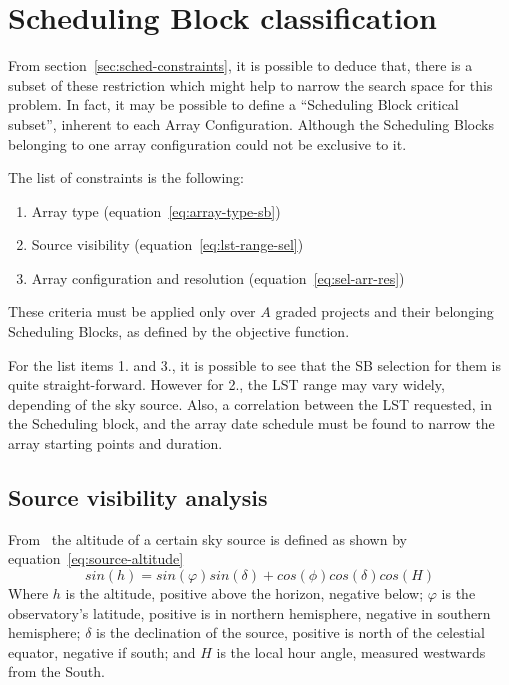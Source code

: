 \section{Scheduling Block classification}
\label{sec:array-sb-classification}
From section~\ref{sec:sched-constraints}, it is possible to deduce that, there is a subset of these restriction which might help to narrow the search space for this problem. In fact, it may be possible to define a ``Scheduling Block critical subset'', inherent to each Array Configuration. Although the Scheduling Blocks belonging to one array configuration could not be exclusive to it.

The list of constraints is the following:
\begin{enumerate}
\item Array type (equation~\ref{eq:array-type-sb})
\item Source visibility (equation~\ref{eq:lst-range-sel})
\item Array configuration and resolution (equation~\ref{eq:sel-arr-res})
\end{enumerate}
These criteria must be applied only over $A$ graded projects and their belonging Scheduling Blocks, as defined by the objective function.

For the list items 1. and 3., it is possible to see that the SB selection for them is quite straight-forward. However for 2., the LST range may vary widely, depending of the sky source. Also, a correlation between the LST requested, in the Scheduling block, and the array date schedule must be found to narrow the array starting points and duration.

\subsection{Source visibility analysis}
From~\cite{meeus98} the altitude of a certain sky source is defined as shown by equation~\ref{eq:source-altitude}
\begin{equation}
\label{eq:source-altitude}
sin(h) = sin(\varphi) sin(\delta) + cos(\phi) cos(\delta) cos(H)
\end{equation}
Where $h$ is the altitude, positive above the horizon, negative below; $\varphi$ is the observatory's latitude, positive is in northern hemisphere, negative in southern hemisphere; $\delta$ is the declination of the source, positive is north of the celestial equator, negative if south; and $H$ is the local hour angle, measured westwards from the South.

